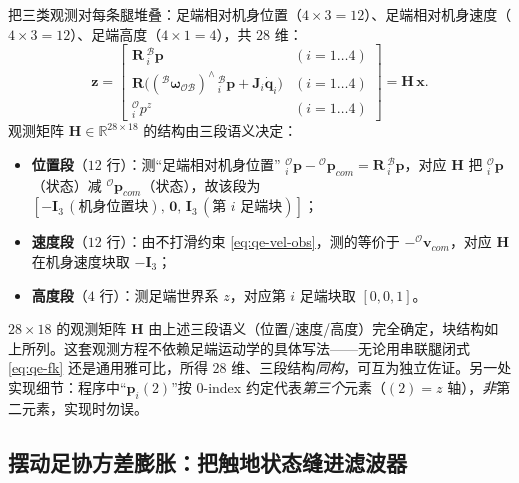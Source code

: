 把三类观测对每条腿堆叠：足端相对机身位置（$4\times3=12$）、足端相对机身速度（$4\times3=12$）、足端高度（$4\times1=4$），共 $28$ 维\cite{yu2021quadruped,unitree2023quadruped}：
\begin{equation}
  \boldsymbol z =
  \begin{bmatrix}
    \mathbf{R}\,{}^{\mathcal{B}}_{i}\boldsymbol p &\!\!(i{=}1\!\dots\!4)\\[3pt]
    \mathbf{R}\big(({}^{\mathcal{B}}\boldsymbol\omega_{\mathcal{OB}})^\wedge\,{}^{\mathcal{B}}_{i}\boldsymbol p + \mathbf{J}_i\dot{\boldsymbol q}_i\big)&\!\!(i{=}1\!\dots\!4)\\[3pt]
    {}^{\mathcal{O}}_{i}p^z &\!\!(i{=}1\!\dots\!4)
  \end{bmatrix}
  = \mathbf{H}\,\boldsymbol x.
  \label{eq:qe-obs-z}
\end{equation}
观测矩阵 $\mathbf{H}\in\mathbb{R}^{28\times18}$ 的结构由三段语义决定：
\begin{itemize}
  \item \textbf{位置段}（$12$ 行）：测“足端相对机身位置” ${}^{\mathcal{O}}_{i}\boldsymbol p-{}^{\mathcal{O}}\boldsymbol p_{com}=\mathbf{R}\,{}^{\mathcal{B}}_{i}\boldsymbol p$，对应 $\mathbf{H}$ 把 ${}^{\mathcal{O}}_{i}\boldsymbol p$（状态）减 ${}^{\mathcal{O}}\boldsymbol p_{com}$（状态），故该段为 $[-\mathbf{I}_3\,(\text{机身位置块}),\,\mathbf{0},\,\mathbf{I}_3\,(\text{第 }i\text{ 足端块})]$；
  \item \textbf{速度段}（$12$ 行）：由不打滑约束 \cref{eq:qe-vel-obs}，测的等价于 $-{}^{\mathcal{O}}\boldsymbol v_{com}$，对应 $\mathbf{H}$ 在机身速度块取 $-\mathbf{I}_3$；
  \item \textbf{高度段}（$4$ 行）：测足端世界系 $z$，对应第 $i$ 足端块取 $[0,0,1]$。
\end{itemize}

\begin{note}\label{note:qe-ocr-H}
$28\times18$ 的观测矩阵 $\mathbf{H}$ 由上述三段语义（位置/速度/高度）完全确定，块结构如上所列。这套观测方程不依赖足端运动学的具体写法——无论用串联腿闭式 \cref{eq:qe-fk} 还是通用雅可比，所得 $28$ 维、三段结构\emph{同构}，可互为独立佐证。另一处实现细节：程序中“$\boldsymbol p_i(2)$”按 $0$-index 约定代表\emph{第三个}元素（$(2)=z$ 轴），\emph{非}第二元素，实现时勿误。
\end{note}

\subsection{摆动足协方差膨胀：把触地状态缝进滤波器}
\label{subsec:qe-cov-inflate}

